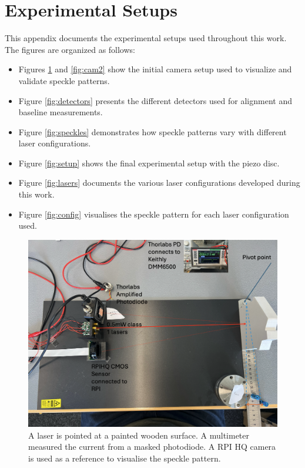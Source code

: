 \clearpage 
\onecolumn
\appendix

\section{Experimental Setups}
\label{sec:experimental-setups}

This appendix documents the experimental setups used throughout this work. The figures are organized as follows:

\begin{itemize}
  \item Figures \ref{fig:cam1} and \ref{fig:cam2} show the initial camera setup used to visualize and validate speckle patterns.
  \item Figure \ref{fig:detectors} presents the different detectors used for alignment and baseline measurements.
  \item Figure \ref{fig:speckles} demonstrates how speckle patterns vary with different laser configurations.
  \item Figure \ref{fig:setup} shows the final experimental setup with the piezo disc.
  \item Figure \ref{fig:lasers} documents the various laser configurations developed during this work.
  \item Figure \ref{fig:config} visualises the speckle pattern for each laser configuration used.
\end{itemize}

\begin{figure}[t]
\centering
\includegraphics[width=\textwidth]{figures/impl/camera_setup.png}
\caption{A laser is pointed at a painted wooden surface. A multimeter measured the current from a masked photodiode. 
A RPI HQ camera is used as a reference to visualise the speckle pattern.}
\label{fig:cam1}
\end{figure}

